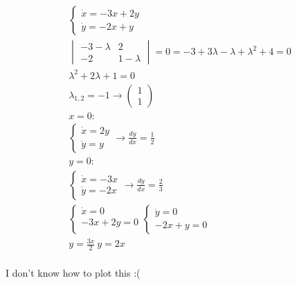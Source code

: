 \documentclass{article}
\begin{document}
\addtolength{\jot}{1pt}
\begin{fleqn}[1\parindent]
  \begin{gather*}
    \begin{cases}
      \dot{x}=-3x+2y\\ 
      \dot{y}=-2x+y
    \end{cases} \\ 
    \begin{vmatrix}
      -3-\lambda & 2 \\ 
      -2 & 1-\lambda
    \end{vmatrix}
    = 0 = -3+3\lambda-\lambda+\lambda^2+4=0 \\ 
    \lambda^2+2\lambda+1 = 0 \\ 
    \lambda_{1,2}=-1 \rightarrow \begin{pmatrix}
      1 \\ 1
    \end{pmatrix} \\
    x = 0: \\ 
    \begin{cases}
      \dot{x} = 2y \\ 
      \dot{y} = y 
    \end{cases} \rightarrow
    \frac{dy}{dx} = \frac{1}{2} \\ 
    y = 0: \\ 
    \begin{cases}
      \dot{x} = -3x \\ 
      \dot{y} = -2x
    \end{cases} \rightarrow
    \frac{dy}{dx} = \frac{2}{3} \\ 
    \begin{cases}
      \dot{x} = 0\\
      -3x+2y=0\\
    \end{cases}
    \begin{cases}
      \dot{y}=0\\ 
      -2x+y=0
    \end{cases} \\ 
    y = \frac{3x}{2}\ y =2x \\ 
  \end{gather*}
\end{fleqn}

I don't know how to plot this :(
\end{document}

